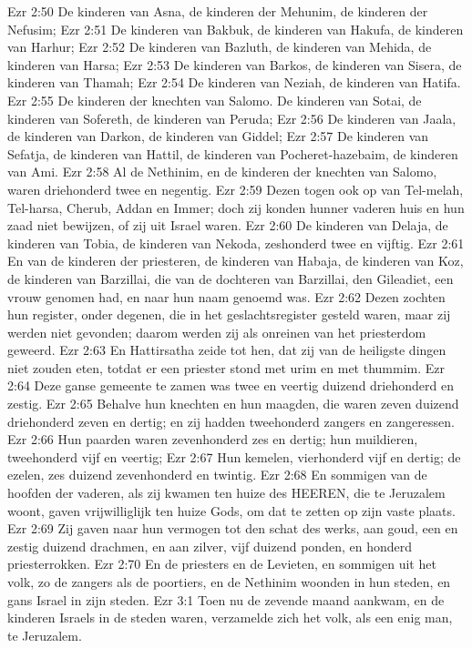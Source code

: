 Ezr 2:50  De kinderen van Asna, de kinderen der Mehunim, de kinderen der Nefusim;
Ezr 2:51  De kinderen van Bakbuk, de kinderen van Hakufa, de kinderen van Harhur;
Ezr 2:52  De kinderen van Bazluth, de kinderen van Mehida, de kinderen van Harsa;
Ezr 2:53  De kinderen van Barkos, de kinderen van Sisera, de kinderen van Thamah;
Ezr 2:54  De kinderen van Neziah, de kinderen van Hatifa.
Ezr 2:55  De kinderen der knechten van Salomo. De kinderen van Sotai, de kinderen van Sofereth, de kinderen van Peruda;
Ezr 2:56  De kinderen van Jaala, de kinderen van Darkon, de kinderen van Giddel;
Ezr 2:57  De kinderen van Sefatja, de kinderen van Hattil, de kinderen van Pocheret-hazebaim, de kinderen van Ami.
Ezr 2:58  Al de Nethinim, en de kinderen der knechten van Salomo, waren driehonderd twee en negentig.
Ezr 2:59  Dezen togen ook op van Tel-melah, Tel-harsa, Cherub, Addan en Immer; doch zij konden hunner vaderen huis en hun zaad niet bewijzen, of zij uit Israel waren.
Ezr 2:60  De kinderen van Delaja, de kinderen van Tobia, de kinderen van Nekoda, zeshonderd twee en vijftig.
Ezr 2:61  En van de kinderen der priesteren, de kinderen van Habaja, de kinderen van Koz, de kinderen van Barzillai, die van de dochteren van Barzillai, den Gileadiet, een vrouw genomen had, en naar hun naam genoemd was.
Ezr 2:62  Dezen zochten hun register, onder degenen, die in het geslachtsregister gesteld waren, maar zij werden niet gevonden; daarom werden zij als onreinen van het priesterdom geweerd.
Ezr 2:63  En Hattirsatha zeide tot hen, dat zij van de heiligste dingen niet zouden eten, totdat er een priester stond met urim en met thummim.
Ezr 2:64  Deze ganse gemeente te zamen was twee en veertig duizend driehonderd en zestig.
Ezr 2:65  Behalve hun knechten en hun maagden, die waren zeven duizend driehonderd zeven en dertig; en zij hadden tweehonderd zangers en zangeressen.
Ezr 2:66  Hun paarden waren zevenhonderd zes en dertig; hun muildieren, tweehonderd vijf en veertig;
Ezr 2:67  Hun kemelen, vierhonderd vijf en dertig; de ezelen, zes duizend zevenhonderd en twintig.
Ezr 2:68  En sommigen van de hoofden der vaderen, als zij kwamen ten huize des HEEREN, die te Jeruzalem woont, gaven vrijwilliglijk ten huize Gods, om dat te zetten op zijn vaste plaats.
Ezr 2:69  Zij gaven naar hun vermogen tot den schat des werks, aan goud, een en zestig duizend drachmen, en aan zilver, vijf duizend ponden, en honderd priesterrokken.
Ezr 2:70  En de priesters en de Levieten, en sommigen uit het volk, zo de zangers als de poortiers, en de Nethinim woonden in hun steden, en gans Israel in zijn steden.
Ezr 3:1  Toen nu de zevende maand aankwam, en de kinderen Israels in de steden waren, verzamelde zich het volk, als een enig man, te Jeruzalem.
